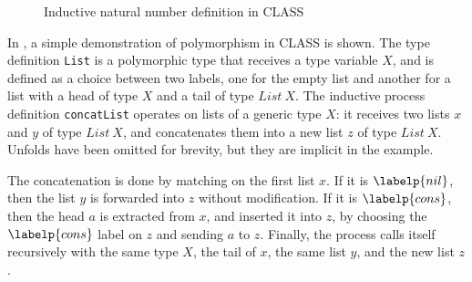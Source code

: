 \begin{figure}
    \centering
    \begin{minipage}{0.45\textwidth}
        \begin{class}
            \z\z
        \end{class}
    \end{minipage}
    \hfill
    \begin{minipage}{0.45\textwidth}
        \begin{class}
        \end{class}
    \end{minipage}
    \caption{Inductive natural number definition in CLASS}
    \label{fig:CLASSNatExample}
\end{figure}

In , a simple demonstration of polymorphism in \ac{CLASS} is shown. The type definition \texttt{List} is a polymorphic type that receives a type variable $X$, and is defined as a choice between two labels, one for the empty list and another for a list with a head of type $X$ and a tail of type $List\ X$. The inductive process definition \texttt{concatList} operates on lists of a generic type $X$: it receives two lists $x$ and $y$ of type $List\ X$, and concatenates them into a new list $z$ of type $List\ X$. Unfolds have been omitted for brevity, but they are implicit in the example.

The concatenation is done by matching on the first list $x$. If it is $\labelp{nil}$, then the list $y$ is forwarded into $z$ without modification. If it is $\labelp{cons}$, then the head $a$ is extracted from $x$, and inserted it into $z$, by choosing the $\labelp{cons}$ label on $z$ and sending $a$ to $z$. Finally, the process calls itself recursively with the same type $X$, the tail of $x$, the same list $y$, and the new list $z$.

